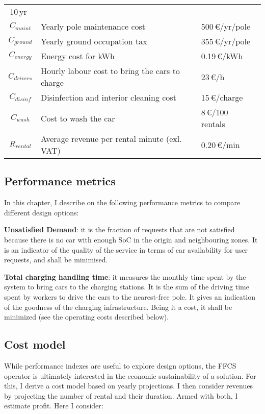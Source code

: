 \begin{table}[t]
\begin{tabular}{|c|l|l|}
        10\,yr~\cite{21_vasconcelos2017financial}\\
        $C_{maint}$ & Yearly pole maintenance cost & 500\,€/yr/pole~\cite{evInfrastructureCosts}\\
        $C_{ground}$ & Yearly ground occupation tax & 355\,€/yr/pole~\cite{cosapTurin}\\
        $C_{energy}$ & Energy cost for kWh & 0.19\,€/kWh~\cite{eurostat}\\
        $C_{drivers}$ & Hourly labour  cost to bring the cars to charge & 23\,€/h~\cite{costo_lavoro}\\
        $C_{disinf}$ & Disinfection and interior cleaning cost & 15\,€/charge~\cite{doctorCarWash}\\
        $C_{wash}$ & Cost to wash the car & 8\,€/100 rentals~\cite{doctorCarWash}\\ \hline
        $R_{rental}$ & Average revenue per rental minute (exl. VAT) & 0.20\,€/min~\cite{car2goPriceTurin}\\
\hline
    \end{tabular}
\end{table}

\subsection{Performance metrics}
In this chapter, I describe on the following performance metrics to compare different design options:

\textbf{Unsatisfied Demand}: it is the fraction of requests that are not satisfied because there is no car with enough SoC in the origin and neighbouring zones. It is an indicator of the quality of the service in terms of car availability for user requests, and shall be minimised.

\textbf{Total charging handling time}: it measures the monthly time spent by the system to bring cars to the charging stations.
It is the sum of the driving time spent by workers to drive the cars to the nearest-free pole. It gives an indication of the goodness of the charging infrastructure. Being it a cost, it shall be minimized (see the operating costs described below).

\subsection{Cost model}
While performance indexes are useful to explore design options, the FFCS operator is ultimately interested in the economic sustainability of a solution. For this, I derive a cost model based on yearly projections.
I then consider revenues by projecting the number of rental and their duration. Armed with both, I estimate profit.
Here I consider:

